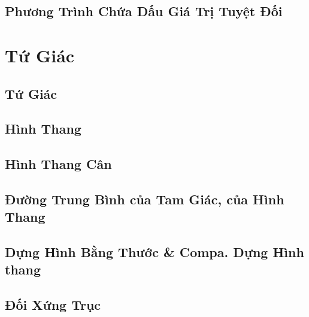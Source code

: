 \documentclass{article}
\numberwithin{equation}{section}
\begin{document}

\subsection{Phương Trình Chứa Dấu Giá Trị Tuyệt Đối}


\section{Tứ Giác}

\subsection{Tứ Giác}


\subsection{Hình Thang}


\subsection{Hình Thang Cân}


\subsection{Đường Trung Bình của Tam Giác, của Hình Thang}


\subsection{Dựng Hình Bằng Thước \& Compa. Dựng Hình thang}


\subsection{Đối Xứng Trục}
\end{document}
